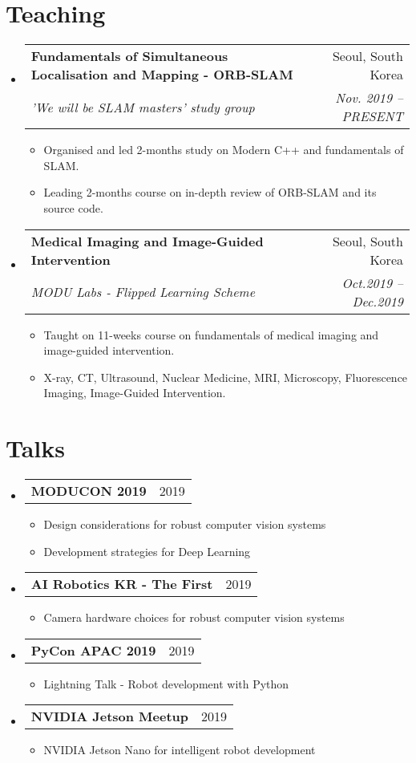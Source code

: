 \documentclass[letterpaper,11pt]{article}
\makeatletter
\newcommand{\resumeItem}[1]{
  \item\small{
    {#1 \vspace{-2pt}}
  }
}
\newcommand{\resumeSubheading}[4]{
  \vspace{-1pt}\item
    \begin{tabular*}{0.97\textwidth}[t]{l@{\extracolsep{\fill}}r}
      \textbf{#1} & #2 \\
      \textit{\small#3} & \textit{\small #4} \\
    \end{tabular*}\vspace{-5pt}
}
\newcommand{\resumeTalk}[2]{
  \vspace{-1pt}\item
    \begin{tabular*}{0.97\textwidth}[t]{l@{\extracolsep{\fill}}r}
      \textbf{#1} & #2 \\
    \end{tabular*}\vspace{-5pt}
}
\newcommand{\resumeSubHeadingListStart}{\begin{itemize}[leftmargin=*]}
\newcommand{\resumeSubHeadingListEnd}{\end{itemize}}
\newcommand{\resumeItemListStart}{\begin{itemize}}
\newcommand{\resumeItemListEnd}{\end{itemize}\vspace{-5pt}}
\makeatother
\begin{document}
\section{Teaching}
    \resumeSubHeadingListStart
        \resumeSubheading{Fundamentals of Simultaneous Localisation and Mapping - ORB-SLAM}{Seoul, South Korea}
        {'We will be SLAM masters' study group}{Nov. 2019 -- PRESENT}
            \resumeItemListStart
                \resumeItem{Organised and led 2-months study on Modern C++ and fundamentals of SLAM.}
                \resumeItem{Leading 2-months course on in-depth review of ORB-SLAM and its source code.}
            \resumeItemListEnd    
        \resumeSubheading{Medical Imaging and Image-Guided Intervention}{Seoul, South Korea}
        {MODU Labs - Flipped Learning Scheme}{Oct.2019 -- Dec.2019}
            \resumeItemListStart
                \resumeItem{Taught on 11-weeks course on fundamentals of medical imaging and image-guided intervention.}
                \resumeItem{X-ray, CT, Ultrasound, Nuclear Medicine, MRI, Microscopy, Fluorescence Imaging, Image-Guided Intervention.}
            \resumeItemListEnd
    \resumeSubHeadingListEnd

\section{Talks}
    \resumeSubHeadingListStart
        \resumeTalk{MODUCON 2019}{2019}
            \resumeItemListStart
                \resumeItem{Design considerations for robust computer vision systems}
                \resumeItem{Development strategies for Deep Learning}
            \resumeItemListEnd
        \resumeTalk{AI Robotics KR - The First}{2019}
            \resumeItemListStart
                \resumeItem{Camera hardware choices for robust computer vision systems}
            \resumeItemListEnd
        \resumeTalk{PyCon APAC 2019}{2019}
            \resumeItemListStart
                \resumeItem{Lightning Talk - Robot development with Python}
            \resumeItemListEnd
        \resumeTalk{NVIDIA Jetson Meetup}{2019}
            \resumeItemListStart
                \resumeItem{NVIDIA Jetson Nano for intelligent robot development}
            \resumeItemListEnd
    \resumeSubHeadingListEnd
\end{document}
